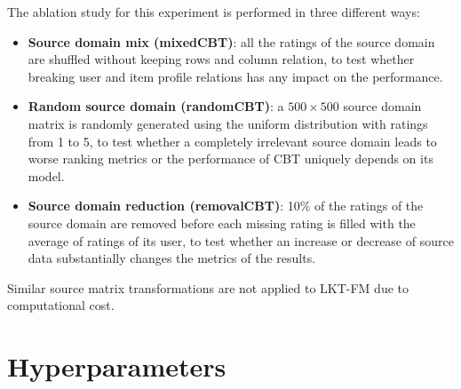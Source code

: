 The ablation study for this experiment is performed in three different ways:
\begin{itemize}
\item \textbf{Source domain mix (mixedCBT)}: all the ratings of the source domain are shuffled without keeping rows and column relation, to test whether breaking user and item profile relations has any impact on the performance.
\item \textbf{Random source domain (randomCBT)}: a $500 \times 500$ source domain matrix is randomly generated using the uniform distribution with ratings from 1 to 5, to test whether a completely irrelevant source domain leads to worse ranking metrics or the performance of CBT uniquely depends on its model.
\item \textbf{Source domain reduction (removalCBT)}: 10\% of the ratings of the source domain are removed before each missing rating is filled with the average of ratings of its user, to test whether an increase or decrease of source data substantially changes the metrics of the results.
\end{itemize}
Similar source matrix transformations are not applied to LKT-FM due to computational cost.



\section{Hyperparameters}

